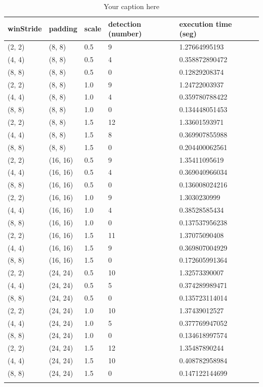 \begin{longtable}{|l|l|l|l|l|l|} 
	\hline
	\textbf{winStride} & \textbf{padding} & \textbf{scale} & \textbf{detection (number)} & \textbf{execution time (seg)} \\ \hline
(2, 2) & (8, 8) & 0.5 & 9 & 1.27664995193 \\ \hline
(4, 4) & (8, 8) & 0.5 & 4 & 0.358872890472 \\ \hline
(8, 8) & (8, 8) & 0.5 & 0 & 0.12829208374 \\ \hline
(2, 2) & (8, 8) & 1.0 & 9 & 1.24722003937 \\ \hline
(4, 4) & (8, 8) & 1.0 & 4 & 0.359780788422 \\ \hline
(8, 8) & (8, 8) & 1.0 & 0 & 0.134448051453 \\ \hline
(2, 2) & (8, 8) & 1.5 & 12 & 1.33601593971 \\ \hline
(4, 4) & (8, 8) & 1.5 & 8 & 0.369907855988 \\ \hline
(8, 8) & (8, 8) & 1.5 & 0 & 0.204400062561 \\ \hline
(2, 2) & (16, 16) & 0.5 & 9 & 1.35411095619 \\ \hline
(4, 4) & (16, 16) & 0.5 & 4 & 0.369040966034 \\ \hline
(8, 8) & (16, 16) & 0.5 & 0 & 0.136008024216 \\ \hline
(2, 2) & (16, 16) & 1.0 & 9 & 1.3030230999 \\ \hline
(4, 4) & (16, 16) & 1.0 & 4 & 0.38528585434 \\ \hline
(8, 8) & (16, 16) & 1.0 & 0 & 0.137537956238 \\ \hline
(2, 2) & (16, 16) & 1.5 & 11 & 1.37075090408 \\ \hline
(4, 4) & (16, 16) & 1.5 & 9 & 0.369807004929 \\ \hline
(8, 8) & (16, 16) & 1.5 & 0 & 0.172605991364 \\ \hline
(2, 2) & (24, 24) & 0.5 & 10 & 1.32573390007 \\ \hline
(4, 4) & (24, 24) & 0.5 & 5 & 0.374289989471 \\ \hline
(8, 8) & (24, 24) & 0.5 & 0 & 0.135723114014 \\ \hline
(2, 2) & (24, 24) & 1.0 & 10 & 1.37439012527 \\ \hline
(4, 4) & (24, 24) & 1.0 & 5 & 0.377769947052 \\ \hline
(8, 8) & (24, 24) & 1.0 & 0 & 0.134618997574 \\ \hline
(2, 2) & (24, 24) & 1.5 & 12 & 1.35487890244 \\ \hline
(4, 4) & (24, 24) & 1.5 & 10 & 0.408782958984 \\ \hline
(8, 8) & (24, 24) & 1.5 & 0 & 0.147122144699 \\ \hline


	\caption{Your caption here} %
	\label{tab:myfirstlongtable}
\end{longtable}

